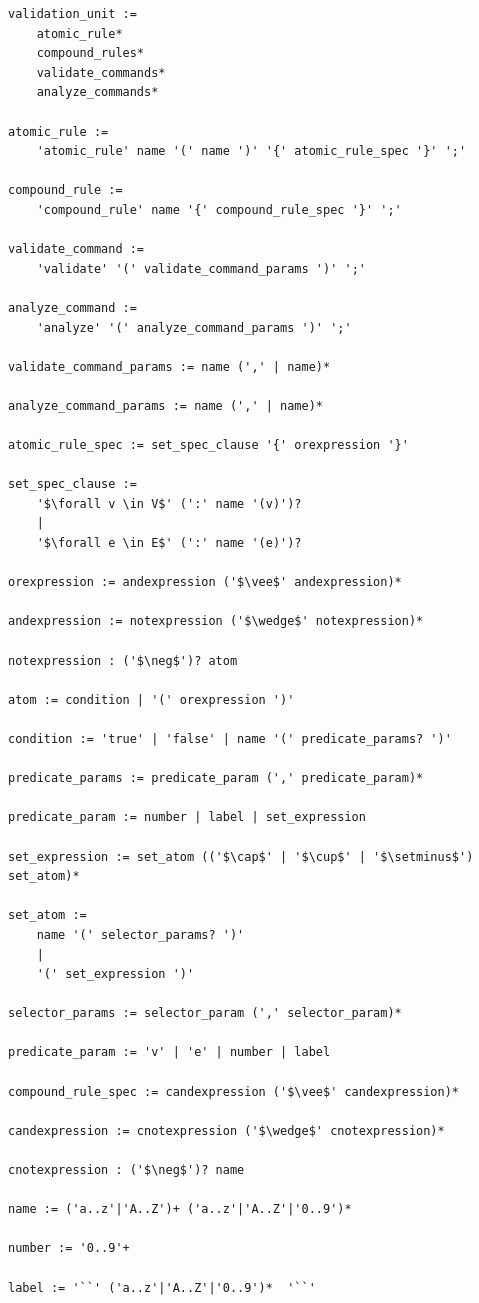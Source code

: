 \begin{lstlisting}[mathescape]
validation_unit :=
    atomic_rule*
    compound_rules*
    validate_commands*
    analyze_commands*

atomic_rule :=
    'atomic_rule' name '(' name ')' '{' atomic_rule_spec '}' ';'

compound_rule :=
    'compound_rule' name '{' compound_rule_spec '}' ';'

validate_command :=
    'validate' '(' validate_command_params ')' ';'

analyze_command :=
    'analyze' '(' analyze_command_params ')' ';'

validate_command_params := name (',' | name)*

analyze_command_params := name (',' | name)*

atomic_rule_spec := set_spec_clause '{' orexpression '}'

set_spec_clause :=
    '$\forall v \in V$' (':' name '(v)')?
    |
    '$\forall e \in E$' (':' name '(e)')?

orexpression := andexpression ('$\vee$' andexpression)*

andexpression := notexpression ('$\wedge$' notexpression)*

notexpression : ('$\neg$')? atom

atom := condition | '(' orexpression ')'

condition := 'true' | 'false' | name '(' predicate_params? ')'

predicate_params := predicate_param (',' predicate_param)*

predicate_param := number | label | set_expression

set_expression := set_atom (('$\cap$' | '$\cup$' | '$\setminus$') set_atom)*

set_atom :=
    name '(' selector_params? ')'
    |
    '(' set_expression ')'

selector_params := selector_param (',' selector_param)*

predicate_param := 'v' | 'e' | number | label

compound_rule_spec := candexpression ('$\vee$' candexpression)*

candexpression := cnotexpression ('$\wedge$' cnotexpression)*

cnotexpression : ('$\neg$')? name

name := ('a..z'|'A..Z')+ ('a..z'|'A..Z'|'0..9')*

number := '0..9'+

label := '``' ('a..z'|'A..Z'|'0..9')*  '``'

\end{lstlisting}

